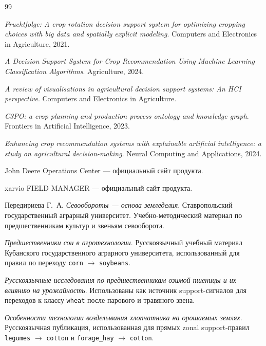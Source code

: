 \clearpage
{}
{}
\renewcommand{\refname}{Список использованных источников}

\begin{thebibliography}{99}

\emph{Fruchtfolge: A crop rotation decision support system for optimizing cropping choices with big data and spatially explicit modeling}. Computers and Electronics in Agriculture, 2021.

\emph{A Decision Support System for Crop Recommendation Using Machine Learning Classification Algorithms}. Agriculture, 2024.

\emph{A review of visualisations in agricultural decision support systems: An HCI perspective}. Computers and Electronics in Agriculture.

\emph{C3PO: a crop planning and production process ontology and knowledge graph}. Frontiers in Artificial Intelligence, 2023.

\emph{Enhancing crop recommendation systems with explainable artificial intelligence: a study on agricultural decision-making}. Neural Computing and Applications, 2024.

John Deere Operations Center --- официальный сайт продукта.

xarvio FIELD MANAGER --- официальный сайт продукта.

Передириева Г.~А. \emph{Севообороты --- основа земледелия}. Ставропольский государственный аграрный университет. Учебно-методический материал по предшественникам культур и звеньям севооборота.

\emph{Предшественники сои в агротехнологии}. Русскоязычный учебный материал Кубанского государственного аграрного университета, использованный для правил по переходу \texttt{corn} $\rightarrow$ \texttt{soybeans}.

\emph{Русскоязычные исследования по предшественникам озимой пшеницы и их влиянию на урожайность}. Использованы как источник support-сигналов для переходов к классу \texttt{wheat} после парового и травяного звена.

\emph{Особенности технологии возделывания хлопчатника на орошаемых землях}. Русскоязычная публикация, использованная для прямых zonal support-правил \texttt{legumes} $\rightarrow$ \texttt{cotton} и \texttt{forage\_hay} $\rightarrow$ \texttt{cotton}.


\end{thebibliography}
